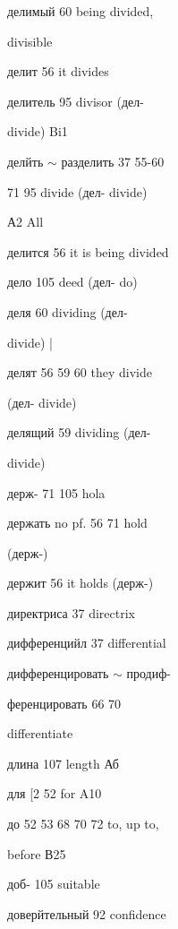 \clearpage
\thispagestyle{plain}
\begingroup
\cyrillicfont
\fontsize{7.25}{8.25}\selectfont
\setlength{\parindent}{0pt}
\setlength{\parskip}{0pt}
\setlength{\emergencystretch}{1.5em}
\noindent
\begin{minipage}[t]{0.475\textwidth}
\raggedright
\noindent делимый 60 being divided,\par
\noindent divisible\par
\noindent делит 56 it divides\par
\noindent делитель 95 divisor (дел-\par
\noindent divide) Bi1\par
\noindent делйть $\sim$ разделить 37 55-60\par
{} 71 95 divide (дел- divide)\par
\noindent А2 All\par
\noindent делится 56 it is being divided\par
\noindent дело 105 deed (дел- do)\par
\noindent деля 60 dividing (дел-\par
\noindent divide) |\par
\noindent делят 56 59 60 they divide\par
\noindent (дел- divide)\par
\noindent делящий 59 dividing (дел-\par
\noindent divide)\par
\noindent держ- 71 105 hola\par
\noindent держать no pf. 56 71 hold\par
\noindent (держ-)\par
\noindent держит 56 it holds (держ-)\par
\noindent директриса 37 directrix\par
\noindent дифференцийл 37 differential\par
\noindent дифференцировать $\sim$ продиф-\par
\noindent ференцировать 66 70\par
\noindent differentiate\par
\noindent длина 107 length Аб\par
\noindent для [2 52 for A10\par
\noindent до 52 53 68 70 72 to, up to,\par
\noindent before В25\par
\noindent доб- 105 suitable\par
\noindent доверйтельный 92 confidence\par

\end{minipage}
